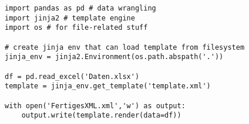 \documentclass[12pt,ngerman]{scrartcl}
\begin{document}
\begin{lstlisting}
import pandas as pd # data wrangling
import jinja2 # template engine
import os # for file-related stuff
 
# create jinja env that can load template from filesystem
jinja_env = jinja2.Environment(os.path.abspath('.'))
 
df = pd.read_excel('Daten.xlsx')
template = jinja_env.get_template('template.xml')
 
with open('FertigesXML.xml','w') as output:
    output.write(template.render(data=df))
\end{lstlisting}
\end{document}
